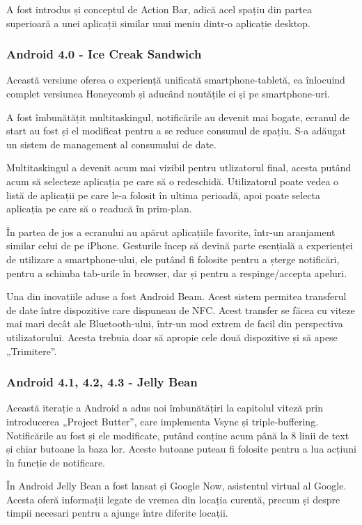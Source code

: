 \documentclass[12pt,a4paper]{article}
\begin{document}
	A fost introdus și conceptul de Action Bar, adică acel spațiu din partea superioară a unei aplicații similar unui meniu dintr-o aplicație desktop.


\subsubsection{Android 4.0 - Ice Creak Sandwich}
Această versiune oferea o experiență unificată smartphone-tabletă, ea înlocuind complet versiunea Honeycomb și aducând noutățile ei și pe smartphone-uri.

	A fost îmbunătățit multitaskingul, notificările au devenit mai bogate, ecranul de start au fost și el modificat pentru a se reduce consumul de spațiu. S-a adăugat un sistem de management al consumului de date.

	Multitaskingul a devenit acum mai vizibil pentru utlizatorul final, acesta putând acum să selecteze aplicația pe care să o redeschidă. Utilizatorul poate vedea o listă de aplicații pe care le-a folosit în ultima perioadă, apoi poate selecta aplicația pe care să o readucă în prim-plan.

	În partea de jos a ecranului au apărut aplicațiile favorite, într-un aranjament similar celui de pe iPhone. Gesturile încep să devină parte esențială a experienței de utilizare a smartphone-ului, ele putând fi folosite pentru a șterge notificări, pentru a schimba tab-urile în browser, dar și pentru a respinge/accepta apeluri.

	Una din inovațiile aduse a fost Android Beam. Acest sistem permitea transferul de date între dispozitive care dispuneau de NFC. Acest transfer se făcea cu viteze mai mari decât ale Bluetooth-ului, într-un mod extrem de facil din perspectiva utilizatorului. Acesta trebuia doar să apropie cele două dispozitive și să apese „Trimitere”.


\subsubsection{Android 4.1, 4.2, 4.3 - Jelly Bean}
Această iterație a Android a adus noi îmbunătățiri la capitolul viteză prin introducerea „Project Butter”, care implementa Vsync și triple-buffering. Notificările au fost și ele modificate, putând conține acum până la 8 linii de text și chiar butoane la baza lor. Aceste butoane puteau fi folosite pentru a lua acțiuni în funcție de notificare.

	În Android Jelly Bean a fost lansat și Google Now, asistentul virtual al Google. Acesta oferă informații legate de vremea din locația curentă, precum și despre timpii necesari pentru a ajunge între diferite locații.
\end{document}
